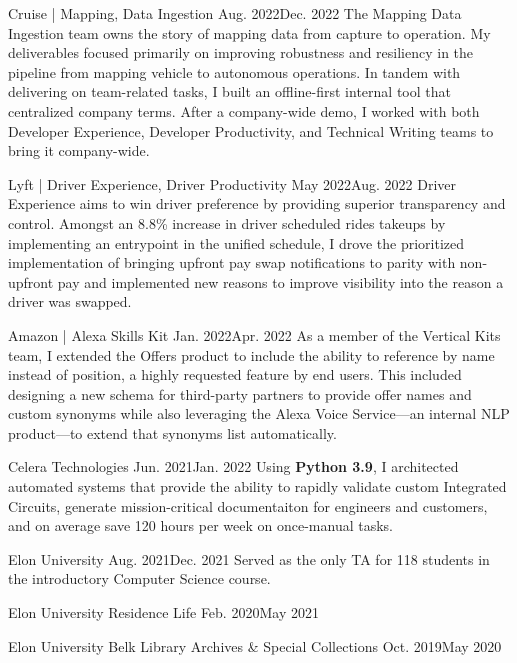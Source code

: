 \documentclass{listofpersonalprofessionalachievements}
\begin{document}
\begin{itemize}
{Cruise | Mapping, Data Ingestion}
{Aug. 2022}{Dec. 2022}
{The Mapping Data Ingestion team owns the story of mapping data from capture to operation. My deliverables focused primarily on improving robustness and resiliency in the pipeline from mapping vehicle to autonomous operations. In tandem with delivering on team-related tasks, I built an offline-first internal tool that centralized company terms. After a company-wide demo, I worked with both Developer Experience, Developer Productivity, and Technical Writing teams to bring it company-wide.}

{Lyft | Driver Experience, Driver Productivity}
{May 2022}{Aug. 2022}
{Driver Experience aims to win driver preference by providing superior transparency and control. Amongst an 8.8\% increase in driver scheduled rides takeups by implementing an entrypoint in the unified schedule, I drove the prioritized implementation of bringing upfront pay swap notifications to parity with non-upfront pay and implemented new reasons to improve visibility into the reason a driver was swapped.}

{Amazon | Alexa Skills Kit}
{Jan. 2022}{Apr. 2022}
{As a member of the Vertical Kits team, I extended the Offers product to include the ability to reference by name instead of position, a highly requested feature by end users. This included designing a new schema for third-party partners to provide offer names and custom synonyms while also leveraging the Alexa Voice Service—an internal NLP product—to extend that synonyms list automatically.}

{Celera Technologies}
{Jun. 2021}{Jan. 2022}
{Using \textbf{Python 3.9}, I architected automated systems that provide the ability to rapidly validate custom Integrated Circuits, generate mission-critical documentaiton for engineers and customers, and on average save 120 hours per week on once-manual tasks.}

{Elon University}
{Aug. 2021}{Dec. 2021}
{Served as the only TA for 118 students in the introductory Computer Science course.}

{Elon University Residence Life}
{Feb. 2020}{May 2021}

{Elon University Belk Library Archives \& Special Collections}
{Oct. 2019}{May 2020}


\end{itemize}
\end{document}

